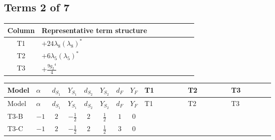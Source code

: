 \documentclass[8pt]{article}
\begin{document}
\begin{landscape}
\subsection*{Terms 2 of 7}
\begin{center}
\begin{tabular}{@{}c >{\raggedright\arraybackslash}p{0.82\linewidth}@{}}
\toprule
Column & Representative term structure \\
\midrule
T1 & \(\displaystyle +24 {\lambda_8} \left({\lambda_8}\right)^{*}\) \\
\midrule
T2 & \(\displaystyle +6 {\lambda_5} \left({\lambda_5}\right)^{*}\) \\
\midrule
T3 & \(\displaystyle +\frac{9 {g_2}^4}{4}\) \\
\midrule
\bottomrule
\end{tabular}
\end{center}
\smallskip
\tiny
\begin{longtable}{@{}llcccccc >{\raggedright\arraybackslash}p{0.21\linewidth} >{\raggedright\arraybackslash}p{0.21\linewidth} >{\raggedright\arraybackslash}p{0.21\linewidth}@{}}
\toprule
Model & $\alpha$ & $d_{S_1}$ & $Y_{S_1}$ & $d_{S_2}$ & $Y_{S_2}$ & $d_F$ & $Y_F$ & T1 & T2 & T3 \\
\midrule
\endfirsthead
\toprule
Model & $\alpha$ & $d_{S_1}$ & $Y_{S_1}$ & $d_{S_2}$ & $Y_{S_2}$ & $d_F$ & $Y_F$ & T1 & T2 & T3 \\
\midrule
\endhead
T3-B & $-1$ & $2$ & $-\frac{1}{2}$ & $2$ & $\frac{1}{2}$ & $1$ & $0$ & \scriptsize\adjustbox{max width=\linewidth}{$\begin{gathered} +24 {\lambda_8} \left({\lambda_8}\right)^{*}\end{gathered}$} & \scriptsize\adjustbox{max width=\linewidth}{$\begin{gathered} +6 {\lambda_5} \left({\lambda_5}\right)^{*}\end{gathered}$} & \scriptsize\adjustbox{max width=\linewidth}{$\begin{gathered} +\frac{9 {g_2}^4}{4}\end{gathered}$} \\
\midrule
T3-C & $-1$ & $2$ & $-\frac{1}{2}$ & $2$ & $\frac{1}{2}$ & $3$ & $0$ & \scriptsize\adjustbox{max width=\linewidth}{$\begin{gathered} +24 {\lambda_8} \left({\lambda_8}\right)^{*}\end{gathered}$} & \scriptsize\adjustbox{max width=\linewidth}{$\begin{gathered} +6 {\lambda_5} \left({\lambda_5}\right)^{*}\end{gathered}$} & \scriptsize\adjustbox{max width=\linewidth}{$\begin{gathered} +\frac{9 {g_2}^4}{4}\end{gathered}$} \\

\end{longtable}
\end{landscape}
\end{document}
